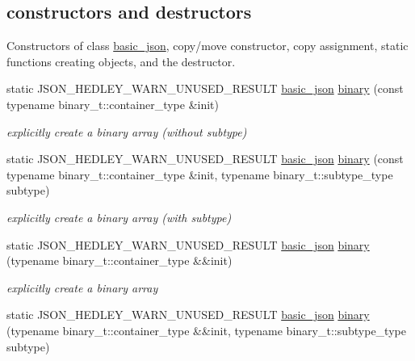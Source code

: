 \subsection*{constructors and destructors}
\label{_amgrpd94b4d3d0135946bb7bdf25e48755337}%
Constructors of class \hyperlink{classnlohmann_1_1basic__json}{basic\+\_\+json}, copy/move constructor, copy assignment, static functions creating objects, and the destructor. \begin{DoxyCompactItemize}
\item 
static J\+S\+O\+N\+\_\+\+H\+E\+D\+L\+E\+Y\+\_\+\+W\+A\+R\+N\+\_\+\+U\+N\+U\+S\+E\+D\+\_\+\+R\+E\+S\+U\+LT \hyperlink{classnlohmann_1_1basic__json}{basic\+\_\+json} \hyperlink{classnlohmann_1_1basic__json_a3d255dbe024ce2d0fdfb1b4837629091}{binary} (const typename binary\+\_\+t\+::container\+\_\+type \&init)
\begin{DoxyCompactList}\small\item\em explicitly create a binary array (without subtype) \end{DoxyCompactList}\item 
static J\+S\+O\+N\+\_\+\+H\+E\+D\+L\+E\+Y\+\_\+\+W\+A\+R\+N\+\_\+\+U\+N\+U\+S\+E\+D\+\_\+\+R\+E\+S\+U\+LT \hyperlink{classnlohmann_1_1basic__json}{basic\+\_\+json} \hyperlink{classnlohmann_1_1basic__json_a7ad4b5b7c96e77d3e105a71ce2147727}{binary} (const typename binary\+\_\+t\+::container\+\_\+type \&init, typename binary\+\_\+t\+::subtype\+\_\+type subtype)
\begin{DoxyCompactList}\small\item\em explicitly create a binary array (with subtype) \end{DoxyCompactList}\item 
static J\+S\+O\+N\+\_\+\+H\+E\+D\+L\+E\+Y\+\_\+\+W\+A\+R\+N\+\_\+\+U\+N\+U\+S\+E\+D\+\_\+\+R\+E\+S\+U\+LT \hyperlink{classnlohmann_1_1basic__json}{basic\+\_\+json} \hyperlink{classnlohmann_1_1basic__json_ab085777bbfbfac5a472120b991ef5cf3}{binary} (typename binary\+\_\+t\+::container\+\_\+type \&\&init)
\begin{DoxyCompactList}\small\item\em explicitly create a binary array \end{DoxyCompactList}\item 
static J\+S\+O\+N\+\_\+\+H\+E\+D\+L\+E\+Y\+\_\+\+W\+A\+R\+N\+\_\+\+U\+N\+U\+S\+E\+D\+\_\+\+R\+E\+S\+U\+LT \hyperlink{classnlohmann_1_1basic__json}{basic\+\_\+json} \hyperlink{classnlohmann_1_1basic__json_a534d4793bcfa81a307b7f3f7eab2cff9}{binary} (typename binary\+\_\+t\+::container\+\_\+type \&\&init, typename binary\+\_\+t\+::subtype\+\_\+type subtype)

\end{DoxyCompactItemize}
